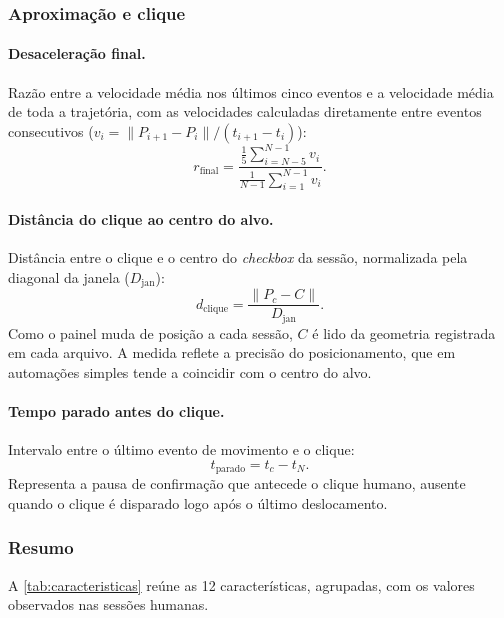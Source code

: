 \subsubsection{Aproximação e clique}

\paragraph{Desaceleração final.} Razão entre a velocidade média nos últimos cinco eventos e a velocidade média de toda a trajetória, com as velocidades calculadas diretamente entre eventos consecutivos ($v_i = \lVert P_{i+1} - P_i \rVert / (t_{i+1} - t_i)$):
\begin{equation}
    r_{\text{final}} = \frac{\frac{1}{5} \sum_{i=N-5}^{N-1} v_i}{\frac{1}{N-1} \sum_{i=1}^{N-1} v_i} .
\end{equation}

\paragraph{Distância do clique ao centro do alvo.} Distância entre o clique e o centro do \textit{checkbox} da sessão, normalizada pela diagonal da janela ($D_{\text{jan}}$):
\begin{equation}
    d_{\text{clique}} = \frac{\lVert P_c - C \rVert}{D_{\text{jan}}} .
\end{equation}
Como o painel muda de posição a cada sessão, $C$ é lido da geometria registrada em cada arquivo. A medida reflete a precisão do posicionamento, que em automações simples tende a coincidir com o centro do alvo.

\paragraph{Tempo parado antes do clique.} Intervalo entre o último evento de movimento e o clique:
\begin{equation}
    t_{\text{parado}} = t_c - t_N .
\end{equation}
Representa a pausa de confirmação que antecede o clique humano, ausente quando o clique é disparado logo após o último deslocamento.

\subsubsection{Resumo}

A \autoref{tab:caracteristicas} reúne as 12 características, agrupadas, com os valores observados nas sessões humanas.

